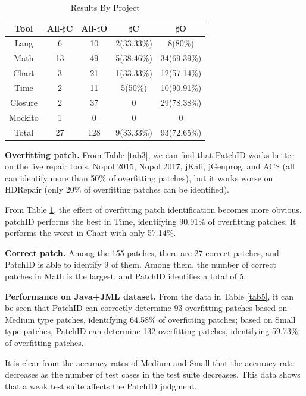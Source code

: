 \begin{table}[ht]
		\begin{minipage}{\textwidth}
			\caption{Results By Project}\label{tab4}%
			\begin{tabular}{ccccc}
				\toprule
				Tool & All-$\sharp$C & All-$\sharp$O &$\sharp$C  &$\sharp$O\\
				\midrule
				Lang    &6 &10 &2(33.33$\%$) &8(80$\%$) \\
				Math    &13 &49 &5(38.46$\%$) &34(69.39$\%$) \\
				Chart    &3 &21 &1(33.33$\%$) &12(57.14$\%$)\\
				Time    &2 &11 &5(50$\%$) &10(90.91$\%$) \\
				Closure    &2 &37 &0 &29(78.38$\%$)\\
				Mockito    &1 &0 &0 &0\\
				Total    &27 &128 &9(33.33$\%$) &93(72.65$\%$)\\
			\bottomrule
			\end{tabular}
		\end{minipage}
\end{table}
\textbf{Overfitting patch.}  From Table \ref{tab3}, we can find that PatchID works better on the five repair tools, Nopol 2015, Nopol 2017, jKali, jGenprog, and ACS (all can identify more than 50\% of overfitting patches), but it works worse on HDRepair (only 20\% of overfitting patches can be identified).

From Table \ref{tab4}, the effect of overfitting patch identification becomes more obvious. patchID performs the best in Time, identifying 90.91\% of overfitting patches. It performs the worst in Chart with only 57.14\%.

\textbf{Correct patch.} Among the 155 patches, there are 27 correct patches, and PatchID is able to identify 9 of them. Among them, the number of correct patches in Math is the largest, and PatchID identifies a total of 5.

\textbf{Performance on Java+JML dataset.} From the data in Table \ref{tab5}, it can be seen that PatchID can correctly determine 93 overfitting patches based on Medium type patches, identifying 64.58\% of overfitting patches; based on Small type patches, PatchID can determine 132 overfitting patches, identifying 59.73\% of overfitting patches.

It is clear from the accuracy rates of Medium and Small that the accuracy rate decreases as the number of test cases in the test suite decreases. This data shows that a weak test suite affects the PatchID judgment.

